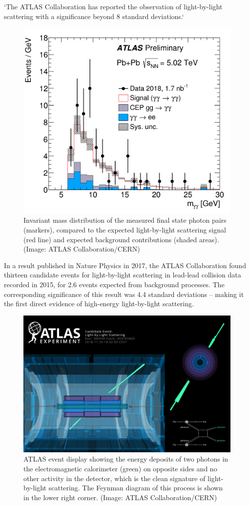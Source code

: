 \documentclass{article}
\begin{document}
`The ATLAS Collaboration has reported the observation of light-by-light scattering with a significance
beyond 8 standard deviations.`

\begin{figure}[ht]
	\centering
	\includegraphics[width=0.5\linewidth]{figures/LbyL-fig2.png}
	\caption{Invariant mass distribution of the measured final state photon pairs (markers), compared
		to the expected light-by-light scattering signal (red line) and expected background contributions
		(shaded areas). (Image: ATLAS Collaboration/CERN)}
	\label{fig:Atlas data}
\end{figure}

In a result published in Nature Physics in 2017, the ATLAS Collaboration found thirteen candidate events for light-by-light scattering in lead-lead collision data recorded in 2015, for 2.6 events expected from background processes. The corresponding significance of this result was 4.4 standard deviations – making it the first direct evidence of high-energy light-by-light scattering.

\begin{figure}[ht]
	\centering
	\includegraphics[width=0.7\linewidth]{figures/EventDisplay_LbyL.png}
	\caption{ATLAS event display showing the energy deposits of two photons in the electromagnetic
		calorimeter (green) on opposite sides and no other activity in the detector, which is the clean signature
		of light-by-light scattering. The Feynman diagram of this process is shown in the lower right corner.
		(Image: ATLAS Collaboration/CERN)}
	\label{fig:Atlas_event}
\end{figure}
\end{document}
